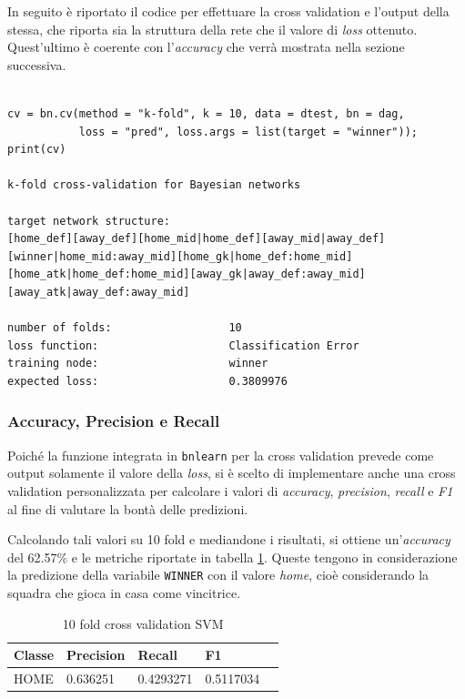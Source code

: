 \documentclass[hidelinks, 12pt]{article}
\begin{document}
In seguito è riportato il codice per effettuare la cross validation e l'output della stessa, che riporta sia la struttura della rete che il valore di \textit{loss} ottenuto. Quest'ultimo è coerente con l'\textit{accuracy} che verrà mostrata nella sezione successiva.

\begin{verbatim}

cv = bn.cv(method = "k-fold", k = 10, data = dtest, bn = dag,
           loss = "pred", loss.args = list(target = "winner"));
print(cv)

k-fold cross-validation for Bayesian networks

target network structure:
[home_def][away_def][home_mid|home_def][away_mid|away_def]
[winner|home_mid:away_mid][home_gk|home_def:home_mid]
[home_atk|home_def:home_mid][away_gk|away_def:away_mid]
[away_atk|away_def:away_mid]

number of folds:                  10 
loss function:                    Classification Error 
training node:                    winner 
expected loss:                    0.3809976 
\end{verbatim}


\subsubsection{Accuracy, Precision e Recall}

Poiché la funzione integrata in \texttt{bnlearn} per la cross validation prevede come output solamente il valore della \textit{loss}, si è scelto di implementare anche una cross validation personalizzata per calcolare i valori di \textit{accuracy}, \textit{precision}, \textit{recall} e \textit{F1} al fine di valutare la bontà delle predizioni.

Calcolando tali valori su 10 fold e mediandone i risultati, si ottiene un'\textit{accuracy} del 62.57\% e le metriche riportate in tabella \ref{tab:10-fold-bin}. Queste tengono in considerazione la predizione della variabile \texttt{WINNER} con il valore \textit{home}, cioè considerando la squadra che gioca in casa come vincitrice.

\begin{table}[H]
	\centering
	\caption{10 fold cross validation SVM}
	\begin{tabular}{l|llll}
		\hline
		Classe & Precision & Recall & F1 \\
		\hline
		HOME & 0.636251 & 0.4293271 & 0.5117034  \\
		\hline
	\end{tabular}
	\label{tab:10-fold-bin}
\end{table}
\end{document}
